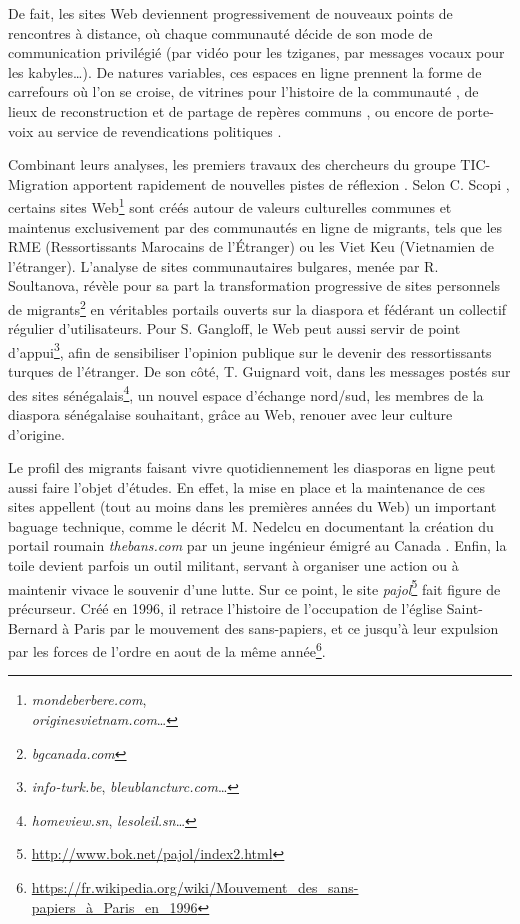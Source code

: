 \documentclass[symmetric,justified,marginals=raggedouter]{tufte-book}
\begin{document}
De fait, les sites Web deviennent progressivement de nouveaux points de rencontres à distance, où chaque communauté décide de son mode de communication privilégié (par vidéo pour les tziganes, par messages vocaux pour les kabyles\ldots{}). De natures variables, ces espaces en ligne prennent la forme de carrefours où l'on se croise, de vitrines pour l'histoire de la communauté \citep{whitaker_tamilnet._2004}, de lieux de reconstruction et de partage de repères communs \citep{sabancioglu_new_2011}, ou encore de porte-voix au service de revendications politiques \citep{kumar_rerouting_2018}.

Combinant leurs analyses, les premiers travaux des chercheurs du groupe TIC-Migration apportent rapidement de nouvelles pistes de réflexion \citep{laflaquiere_archiver_2005}. Selon C. Scopi \citep{scopsi_les_2009}, certains sites Web\footnote{\RaggedOuter \textit{mondeberbere.com},\\ \textit{originesvietnam.com}\ldots{}} sont créés autour de valeurs culturelles communes et maintenus exclusivement par des communautés en ligne de migrants, tels que les RME (Ressortissants Marocains de l'Étranger) ou les Viet Keu (Vietnamien de l'étranger). L'analyse de sites communautaires bulgares, menée par R. Soultanova, révèle pour sa part la transformation progressive de sites personnels de migrants\footnote{\RaggedOuter \textit{bgcanada.com}} en véritables portails ouverts sur la diaspora et fédérant un collectif régulier d'utilisateurs.  Pour S. Gangloff, le Web peut aussi servir de point d'appui\footnote{\RaggedOuter \textit{info-turk.be}, \textit{bleublancturc.com}\ldots{}}, afin de sensibiliser l'opinion publique sur le devenir des ressortissants turques de l'étranger. De son côté, T. Guignard voit, dans les messages postés sur des sites sénégalais\footnote{\RaggedOuter \textit{homeview.sn}, \textit{lesoleil.sn}\ldots{}}, un nouvel espace d'échange nord/sud, les membres de la diaspora sénégalaise souhaitant, grâce au Web, renouer avec leur culture d'origine. 

Le profil des migrants faisant vivre quotidiennement les diasporas en ligne peut aussi faire l'objet d'études. En effet, la mise en place et la maintenance de ces sites appellent (tout au moins dans les premières années du Web) un important baguage technique, comme le décrit M. Nedelcu en documentant la création du portail roumain \textit{thebans.com} par un jeune ingénieur émigré au Canada \citep{nedelcu_e-communautarisme_2003}. Enfin, la toile devient parfois un outil militant, servant à organiser une action ou à maintenir vivace le souvenir d'une lutte. Sur ce point, le site \textit{pajol}\footnote{\RaggedOuter \url{http://www.bok.net/pajol/index2.html}} fait figure de précurseur. Créé en 1996, il retrace l'histoire de l'occupation de l'église Saint-Bernard à Paris par le mouvement des sans-papiers, et ce jusqu'à leur expulsion par les forces de l'ordre en aout de la même année\footnote{\RaggedOuter \url{https://fr.wikipedia.org/wiki/Mouvement_des_sans-papiers_à_Paris_en_1996}}.
\end{document}
